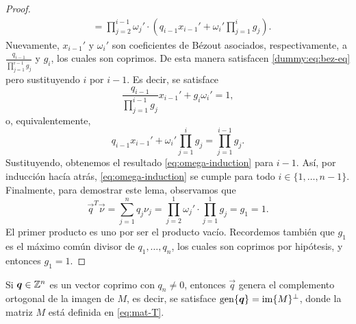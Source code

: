 \begin{proof}
\begin{align*}
		&= \prod_{j=2}^{i-1}\omega_j' \cdot \left( q_{i-1}x_{i-1}' + \omega_i'
			\prod_{j=1}^{i}g_j \right).
	\end{align*}
	Nuevamente, $x_{i-1}'$ y $\omega_i'$ son coeficientes de Bézout asociados, respectivamente, a
	$\frac{q_{i-1}}{\prod_{j=1}^{i-1}g_j}$ y $g_i$, los cuales son coprimos. De esta manera
	satisfacen \eqref{dummy:eq:bez-eq} pero sustituyendo $i$ por $i - 1$. Es decir, se satisface
	\begin{equation*}
		\frac{q_{i-1}}{\prod_{j=1}^{i-1}g_j}x_{i-1}' +
		g_i \omega_i' = 1,
	\end{equation*}
	o, equivalentemente,
	\begin{equation*}
		q_{i-1}x_{i-1}' + \omega_i'\prod_{j=1}^{i}g_j = \prod_{j=1}^{i-1}g_j.
	\end{equation*}
	Sustituyendo, obtenemos el resultado \eqref{eq:omega-induction} para $i - 1$. Así, por inducción
	hacía atrás, \eqref{eq:omega-induction} se cumple para todo $i \in \lbrace 1, \ldots, n - 1
	\rbrace$. Finalmente, para demostrar este lema, observamos que
	\begin{equation*}
		\vec{q}^T\vec{\nu} = \sum_{j=1}^{n}q_j\nu_j = \prod_{j=2}^{1}\omega_j'
		\cdot \prod_{j=1}^{1}g_j = g_1 = 1.
	\end{equation*}
	El primer producto es uno por ser el producto vacío. Recordemos también que $g_1$ es el máximo
	común divisor de $q_1, \ldots, q_n$, los cuales son coprimos por hipótesis, y entonces $g_1 = 1$.
\end{proof}
\begin{lemma}
	\label{lemma:iso2}
	Si $\boldsymbol{q} \in \mathbb{Z}^n$ es un vector coprimo con $q_n \neq 0$, entonces $\vec{q}$ genera el
	complemento ortogonal de la imagen de $M$, es decir, se satisface $\operatorname{gen}\lbrace \boldsymbol{q} \rbrace =
	\operatorname{im}\lbrace M \rbrace^\perp$, donde la matriz $M$ está definida en \eqref{eq:mat-T}.
\end{lemma}
